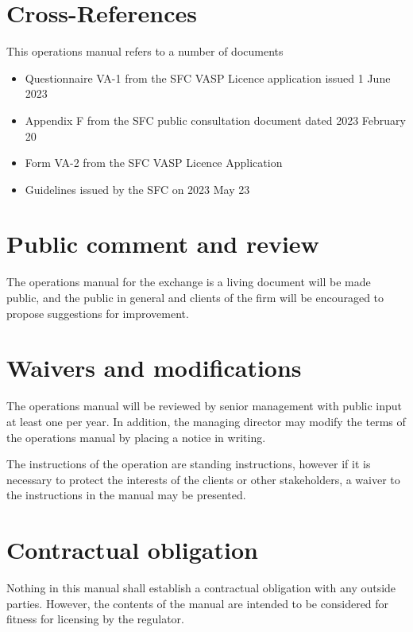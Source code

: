 \section{Cross-References}
This operations manual refers to a number of documents
\begin{itemize}
  \item Questionnaire VA-1 from the SFC VASP Licence application
    issued 1 June 2023
  \item Appendix F from the SFC public consultation document dated
    2023 February 20
  \item Form VA-2 from the SFC VASP Licence Application
  \item Guidelines issued by the SFC on 2023 May 23
\end{itemize}

\section{Public comment and review}
The operations manual for the exchange is a living document will be
made public, and the public in general and clients of the firm will be
encouraged to propose suggestions for improvement.

\section{Waivers and modifications}
The operations manual will be reviewed by senior management with
public input at least one per year.  In addition, the managing
director may modify the terms of the operations manual by placing a
notice in writing.

The instructions of the operation are standing instructions, however
if it is necessary to protect the interests of the
clients or other stakeholders, a waiver to the instructions in the
manual may be presented.

\section{Contractual obligation}
Nothing in this manual shall establish a contractual obligation with
any outside parties.  However, the contents of the manual are intended
to be considered for fitness for licensing by the regulator.

